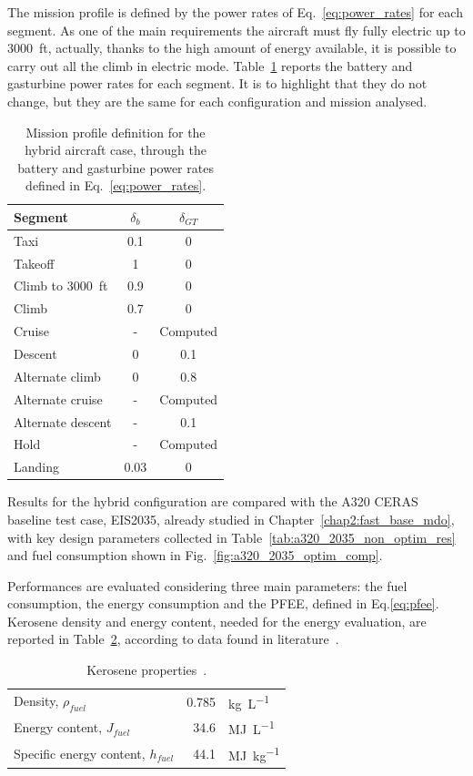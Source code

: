 The mission profile is defined by the power rates of Eq.~\eqref{eq:power_rates} for each segment.
As one of the main requirements the aircraft must fly fully electric up to 3000~ft, actually, thanks to the high amount of energy available, it is possible to carry out all the climb in electric mode. 
Table~\ref{tab:hybrid_dep_mission_profile} reports the battery and gasturbine power rates for each segment. 
It is to highlight that they do not change, but they are the same for each configuration and mission analysed. 
\begin{table}[!h]
	\centering
	\begin{tabular}{l c c}
		\hline
		\textbf{Segment} & $\delta_b$ & $\delta_{GT}$ \\
		\hline
		Taxi & 0.1 & 0 \\
		Takeoff & 1 & 0 \\
		Climb to 3000~ft & 0.9 & 0 \\
		Climb & 0.7 & 0 \\
		Cruise & - & Computed \\
		Descent & 0 & 0.1 \\
		Alternate climb & 0 & 0.8 \\
		Alternate cruise & - & Computed \\
		Alternate descent & - & 0.1 \\
		Hold & - & Computed \\
		Landing & 0.03 & 0 \\
		\hline
	\end{tabular}
	\caption{Mission profile definition for the hybrid aircraft case, through the battery and gasturbine power rates defined in Eq.~\eqref{eq:power_rates}.}
	\label{tab:hybrid_dep_mission_profile}
\end{table}
Results for the hybrid configuration are compared with the A320 CERAS baseline test case, EIS2035, already studied in Chapter~\ref{chap2:fast_base_mdo}, with key design parameters collected in Table~\ref{tab:a320_2035_non_optim_res} and fuel consumption shown in Fig.~\ref{fig:a320_2035_optim_comp}. 

Performances are evaluated considering three main parameters: the fuel consumption, the energy consumption and the PFEE, defined in Eq.\eqref{eq:pfee}. 
Kerosene density and energy content, needed for the energy evaluation, are reported in Table~\ref{tab:fuel_prop}, according to data found in literature~\cite{bib:edwards}.
\begin{table}[!h]
	\centering
	\begin{tabular}{l r l}
		\hline
		Density, $\rho_{fuel}$ & 0.785 & \si{\kilogram\per\liter} \\
		Energy content, $J_{fuel}$ & 34.6 & \si{\mega\joule\per\liter} \\
		Specific energy content, $h_{fuel}$ & 44.1 & \si{\mega\joule\per\kilogram} \\
		\hline
	\end{tabular}
	\caption{Kerosene properties~\cite{bib:edwards}.}
	\label{tab:fuel_prop}
\end{table}

